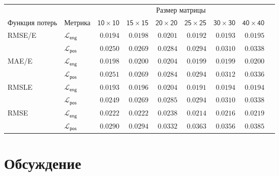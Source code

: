 \documentclass[a4paper,12pt]{extarticle}
\begin{document}
\begin{table}[ht]
	\footnotesize
	\centering
	\begin{tabular}{llrrrrrrr}
		\toprule
		{} & {} & \multicolumn{6}{c}{\textsf{Размер матрицы}} \\
		\cmidrule(lr){3-8}
		\textsf{Функция потерь} & \textsf{Метрика} & $\mathsf{10 \times 10}$ &  $\mathsf{15 \times 15}$ &  $\mathsf{20 \times 20}$ &  $\mathsf{25 \times 25}$ &  $\mathsf{30 \times 30}$ &  $\mathsf{40 \times 40}$ \\
		\midrule
        \textsf{RMSE/E} & $\mathcal{L}_{\mathsf{eng}}$ & $\mathsf{0.0194}$ & $\mathsf{0.0198}$ & $\mathsf{0.0201}$ & $\mathsf{0.0192}$ & $\mathsf{0.0193}$ & $\mathsf{0.0195}$ \\
        {} & $\mathcal{L}_{\mathsf{pos}}$ & $\mathsf{0.0250}$ & $\mathsf{0.0269}$ & $\mathsf{0.0284}$ & $\mathsf{0.0294}$ & $\mathsf{0.0310}$ & $\mathsf{0.0338}$ \\
        \midrule
        \textsf{MAE/E} & $\mathcal{L}_{\mathsf{eng}}$ & $\mathsf{0.0198}$ & $\mathsf{0.0200}$ & $\mathsf{0.0204}$ & $\mathsf{0.0199}$ & $\mathsf{0.0199}$ & $\mathsf{0.0200}$ \\
        {} & $\mathcal{L}_{\mathsf{pos}}$ & $\mathsf{0.0251}$ & $\mathsf{0.0269}$ & $\mathsf{0.0284}$ & $\mathsf{0.0294}$ & $\mathsf{0.0312}$ & $\mathsf{0.0336}$ \\
        \midrule
        \textsf{RMSLE} & $\mathcal{L}_{\mathsf{eng}}$ & $\mathsf{0.0193}$ & $\mathsf{0.0196}$ & $\mathsf{0.0204}$ & $\mathsf{0.0191}$ & $\mathsf{0.0194}$ & $\mathsf{0.0194}$ \\
        {} & $\mathcal{L}_{\mathsf{pos}}$ & $\mathsf{0.0249}$ & $\mathsf{0.0269}$ & $\mathsf{0.0285}$ & $\mathsf{0.0294}$ & $\mathsf{0.0310}$ & $\mathsf{0.0338}$ \\
        \midrule
        \textsf{RMSE} & $\mathcal{L}_{\mathsf{eng}}$ & $\mathsf{0.0222}$ & $\mathsf{0.0222}$ & $\mathsf{0.0238}$ & $\mathsf{0.0214}$ & $\mathsf{0.0216}$ & $\mathsf{0.0219}$ \\
        {} & $\mathcal{L}_{\mathsf{pos}}$ & $\mathsf{0.0290}$ & $\mathsf{0.0294}$ & $\mathsf{0.0332}$ & $\mathsf{0.0363}$ & $\mathsf{0.0356}$ & $\mathsf{0.0385}$ \\
		\bottomrule
	\end{tabular}
    \caption{}
	\label{table:all_models}
\end{table}

\section{Обсуждение}
\end{document}
